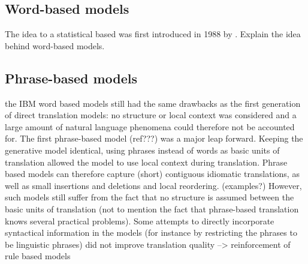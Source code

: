 \documentclass{report}
\theoremstyle{indented}
\begin{document}

\subsection{Word-based models}

The idea to a statistical based was first introduced in 1988 by \citeauthor{brown1988statistical}.
Explain the idea behind word-based models.

\subsection{Phrase-based models}

the IBM word based models still had the same drawbacks as the first generation of direct translation models: no structure or local context was considered and a large amount of natural language phenomena could therefore not be accounted for. The first phrase-based model (ref???) was a major leap forward. Keeping the generative model identical, using phrases instead of words as basic units of translation allowed the model to use local context during translation. Phrase based models can therefore capture (short) contiguous idiomatic translations, as well as small insertions and deletions and local reordering. (examples?) However, such models still suffer from the fact that no structure is assumed between the basic units of translation (not to mention the fact that phrase-based translation knows several practical problems). Some attempts to directly incorporate syntactical information in the models (for instance by restricting the phrases to be linguistic phrases) did not improve translation quality --> reinforcement of rule based models

\end{document}
